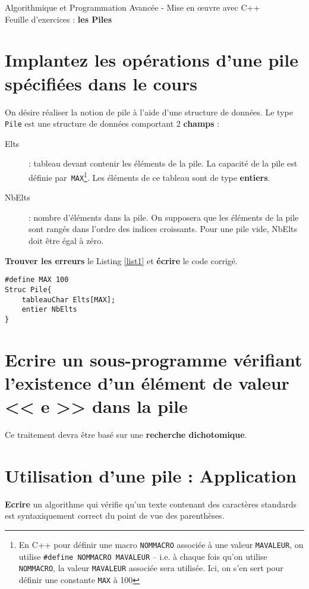\documentclass[french]{article}
\begin{document}
	
	\begin{minipage}{\textwidth}
		\begin{center}
			
			{\Large Algorithmique et Programmation Avancée - Mise en œuvre avec C++ \\ Feuille d'exercices : \textbf{les Piles}}
		\end{center}
	\end{minipage}
	\section{Implantez les opérations d’une pile spécifiées dans le cours}
On désire réaliser la notion de pile à l'aide d'une structure de données. 
Le type \texttt{Pile} est une structure de données comportant 2 \textbf{champs} :
\begin{description}
	\item[Elts] : tableau devant contenir les éléments de la pile. La capacité de la pile est définie par~\texttt{MAX}\footnote{En C++ pour définir une macro \texttt{NOMMACRO} associée à une valeur \texttt{MAVALEUR}, on utilise \texttt{\#define NOMMACRO MAVALEUR} -- i.e. à chaque fois qu'on utilise \texttt{NOMMACRO}, la valeur \texttt{MAVALEUR} associée sera utilisée. Ici, on s'en sert pour définir une constante \texttt{MAX} à 100}. Les éléments de ce tableau sont de type \textbf{entiers}.
	\item[NbElts] : nombre d’éléments dans la pile. On supposera que les éléments de la pile sont rangés dans l’ordre des indices croissants. Pour une pile vide, NbElts doit être égal à zéro.
\end{description}

\textbf{Trouver les erreurs} le Listing \ref{list1} et \textbf{écrire} le code corrigé.
	\begin{lstlisting}[caption={A corriger: Structure Pile},label=list1]
#define MAX 100
Struc Pile{
	tableauChar Elts[MAX];
	entier NbElts
} 
\end{lstlisting}

\section{Ecrire un sous-programme vérifiant l’existence d’un élément de valeur << e >> dans la pile}
Ce traitement devra être basé sur une \textbf{recherche dichotomique}.

\section{Utilisation d’une pile : Application}
\textbf{Ecrire} un algorithme qui vérifie qu’un texte contenant des caractères standards est syntaxiquement correct du point de vue des parenthèses.
\end{document}
